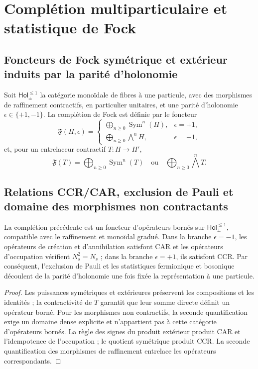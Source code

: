 \section{Complétion multiparticulaire et statistique de Fock}

\subsection{Foncteurs de Fock symétrique et extérieur induits par la parité d'holonomie}

Soit \(\mathsf{Hol}_{\pm}^{\leq1}\) la catégorie monoïdale de fibres à une
particule, avec des morphismes de raffinement contractifs, en particulier unitaires,
et une parité d'holonomie
\(\epsilon\in\{+1,-1\}\). La complétion de Fock est définie par le foncteur
\[
 \mathfrak F(H,\epsilon)=
 \begin{cases}
 \displaystyle\bigoplus_{n\ge0}\operatorname{Sym}^n(H),
     &\epsilon=+1,\\[2mm]
 \displaystyle\bigoplus_{n\ge0}\bigwedge^n\!H,
     &\epsilon=-1,
 \end{cases}
\]
et, pour un entrelaceur contractif \(T:H\to H'\),
\[
 \mathfrak F(T)=
 \bigoplus_{n\ge0}\operatorname{Sym}^n(T)
 \quad\text{ou}\quad
 \bigoplus_{n\ge0}\bigwedge^n\!T.
\]

\subsection{Relations CCR/CAR, exclusion de Pauli et domaine des morphismes non contractants}

\begin{theorem}
La complétion précédente est un foncteur d'opérateurs bornés sur
\(\mathsf{Hol}_{\pm}^{\leq1}\), compatible avec le raffinement et
monoïdal gradué. Dans la branche \(\epsilon=-1\), les opérateurs de création et
d'annihilation satisfont CAR et les opérateurs d'occupation vérifient
\(N_s^2=N_s\) ; dans la branche \(\epsilon=+1\), ils satisfont CCR. Par conséquent,
l'exclusion de Pauli et les statistiques fermionique et bosonique découlent de la
parité d'holonomie une fois fixée la représentation à une particule.
\end{theorem}

\begin{proof}
Les puissances symétriques et extérieures préservent les compositions et les identités ;
la contractivité de \(T\) garantit que leur somme directe définit un opérateur
borné. Pour les morphismes non contractifs, la seconde quantification exige un
domaine dense explicite et n'appartient pas à cette catégorie d'opérateurs bornés.
La règle des signes du produit extérieur produit CAR et l'idempotence de
l'occupation ; le quotient symétrique produit CCR. La seconde quantification des
morphismes de raffinement entrelace les opérateurs correspondants.
\end{proof}

